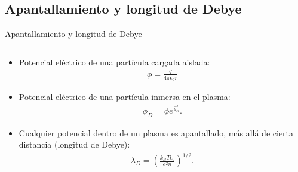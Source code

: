 \documentclass[11pt]{beamer}
\begin{document}
    \subsection{Apantallamiento y longitud de Debye}
        \begin{frame}{Apantallamiento y longitud de Debye}
        
        \fontsize{8pt}{10}\selectfont
        \begin{columns}
        \begin{column}{0.4\textwidth}
        \begin{block}{}
            \begin{itemize}
            \item Potencial el\'ectrico de una partícula cargada aislada:
            \begin{align*}
                \phi = \frac{q}{4\pi\epsilon_0r}
            \end{align*}
            \item Potencial el\'ectrico de una partícula inmersa en el plasma: 
            \begin{align*}
                \phi_D = \phi e^{\frac{-r}{\lambda_D}}.
            \end{align*}
            \item Cualquier potencial dentro de un plasma es apantallado, más allá de cierta distancia (longitud de Debye):
            \begin{align*}
            \lambda_D = \left(\frac{k_BT\epsilon_0}{e^2n}\right)^{1/2}.
        \end{align*}
        \end{itemize}
        \end{block}
        \end{column}
        

\end{columns}
\end{frame}
\end{document}

